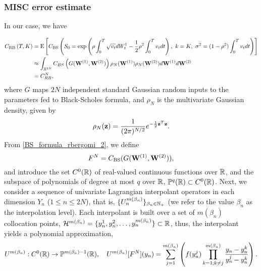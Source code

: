 \subsubsection{MISC error estimate}


In our case, we have

\begin{align}\label{BS_formula_rbergomi_2}
C_{\text{RB}}\left( T, K \right)&=\text{E}\left[C_{\text{BS}}\left( S_0 = \operatorname{exp}\left(\rho \int_0^T \sqrt{v_t} dW_t^1 - \frac{1}{2}
\rho^2 \int_0^T v_t dt\right),\ k = K, \ \sigma^2 = (1-\rho^2)
\int_0^T v_t dt \right) \right] \nonumber \\
&\approx \int_{\mathbb{R}^{2N}} C_{BS} \left(G(\mathbf{W}^{(1)},\mathbf{W}^{(2)})\right) \rho_{N}(\mathbf{W}^{(1)})  \rho_{N}(\mathbf{W}^{(2)}) d\mathbf{W}^{(1)} d\mathbf{W}^{(2)} \nonumber \\
&=C_{RB}^{N},
\end{align}
where $G$  maps  $2N$ independent standard Gaussian random inputs to the parameters fed to Black-Scholes formula, and  $\rho_N$ is the multivariate Gaussian density, given by 
\begin{equation*}\label{eq: multivariate gaussian distribution}
\rho_N(\mathbf{z})=\frac{1}{(2 \pi)^{N/2}} e^{-\frac{1}{2} \mathbf{z}^T \mathbf{z}} .
\end{equation*} 
From  \eqref{BS_formula_rbergomi_2}, we define
\begin{equation*}
F^N=C_{\text{BS}}(G(\mathbf{W}^{(1)},\mathbf{W}^{(2)})) ,
\end{equation*}
and introduce the set $C^0(\mathbb{R})$ of real-valued continuous functions over $\mathbb{R}$, and the subspace of polynomials of degree at most $q$ over $\mathbb{R}$, $\mathbb{P}^q(\mathbb{R}) \subset C^0(\mathbb{R})$. Next,
we consider a sequence of univariate Lagrangian interpolant operators in each dimension $Y_n$ ($1 \le n \le 2N$), that is, $\{U_n^{m(\beta_n)}\}_{\beta_n \in \mathbb{N}_+}$ (we refer to the value $\beta_n$ as the interpolation level). Each interpolant is built over a set of $m(\beta_n)$ collocation points, $\mathcal{H}^{m(\beta_n)}=\{y^1_n,y^2_n,\dots,y^{m(\beta_n)}_n\} \subset \mathbb{R}$, thus, the interpolant yields a polynomial approximation,
\begin{equation*}
U^{m(\beta_n)}:C^0(\mathbb{R}) \rightarrow \mathbb{P}^{m(\beta_n)-1}(\mathbb{R}), \quad U^{m(\beta_n)}[F^N](y_n)= \sum_{j=1}^{m(\beta_n)} \left( f(y^j_n) \prod_{k=1;k \neq j}^{m(\beta_n)} \frac{y_n-y_n^k}{y_n^j-y_n^k}\right) .
\end{equation*}
